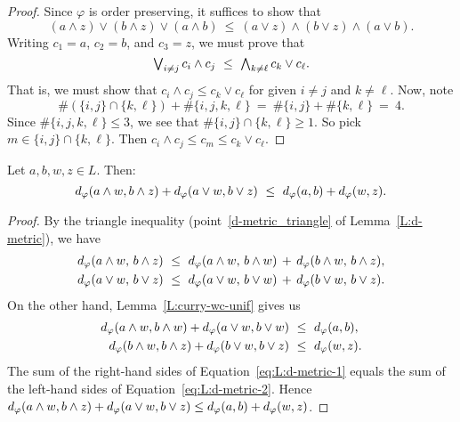 \documentclass[main.tex]{subfiles}
\begin{document}
\begin{proof}
Since $\varphi$ is order preserving,
it suffices to show that 
\begin{equation*}
 (a\wedge z) \vee (b\wedge z) \vee (a\wedge b)
\ \leq\ 
  (a\vee z) \wedge (b\vee z) \wedge (a\vee b).
\end{equation*}
Writing $c_1 = a$, $c_2 = b$, and $c_3 = z$,
we must prove that 
\begin{equation*}
\textstyle{\bigvee}_{i\neq j}\, c_i \wedge c_j \ \leq\ \textstyle{\bigwedge}_{k\neq \ell}\, c_k \vee c_\ell.
\end{equation*}
That is,
we must show that 
$c_i \wedge c_j \leq c_k \vee c_\ell$
for given $i\neq j$ and $k\neq \ell$.
Now, note
\begin{equation*}
\# (\{ i,j \} \cap \{ k,\ell\}) + \#\{i,j,k,\ell\}
\ = \ \# \{i,j\} + \# \{k,\ell \}
\ = \ 4.
\end{equation*}
Since  $\# \{ i,j,k,\ell \}\leq 3$,
we see that $\# \{ i,j \} \cap \{ k,\ell\} \geq 1$.
So pick $m\in  \{ i,j \} \cap \{ k,\ell\}$.
Then $c_i \wedge c_j \leq c_m \leq c_k \vee c_\ell$.
\end{proof}
%
%
\begin{lem}
\label{L:wv-unif}
Let $a,b,w,z\in L$.  Then:
\begin{equation*}
\ld\varphi(a\wedge w,b\wedge z) + \ld\varphi(a \vee w,b\vee z)
\ \leq\ 
\ld\varphi(a,b) + \ld\varphi(w,z).
\end{equation*}
\end{lem}
\begin{proof}
By the triangle inequality (point~\ref{d-metric_triangle}
of Lemma~\ref{L:d-metric}),
we have
\begin{equation}
\label{eq:L:d-metric-1}
\begin{alignedat}{3}
\ld\varphi(a\wedge w,\,b\wedge z)\ &\leq\ 
\ld\varphi(a\wedge w,\,b\wedge w)\,+\,
\ld\varphi(b\wedge w,\,b\wedge z), \\
\ld\varphi(a\vee w,\,b\vee z)\ &\leq\ 
\ld\varphi(a\vee w,\,b\vee w)\,+\,
\ld\varphi(b\vee w,\,b\vee z).
\end{alignedat}
\end{equation}
On the other hand, Lemma~\ref{L:curry-wc-unif} gives us
\begin{equation}
\label{eq:L:d-metric-2}
\begin{alignedat}{3}
d_\varphi(a\wedge w,b\wedge w) + d_\varphi(a\vee w,b\vee w)
   \ &\leq\ d_\varphi(a,b), \\
d_\varphi(b\wedge w,b\wedge z) + d_\varphi(b\vee w, b\vee z)
   \ &\leq\ d_\varphi(w,z).
\end{alignedat}
\end{equation}
The sum of the right-hand sides of Equation~\eqref{eq:L:d-metric-1}
equals the sum of the left-hand sides of Equation~\eqref{eq:L:d-metric-2}.
Hence
$d_\varphi(a\wedge w,b\wedge z) + d_\varphi(a \vee w,b\vee z)
\leq 
d_\varphi(a,b) + d_\varphi(w,z)$.
\end{proof}
\end{document}
